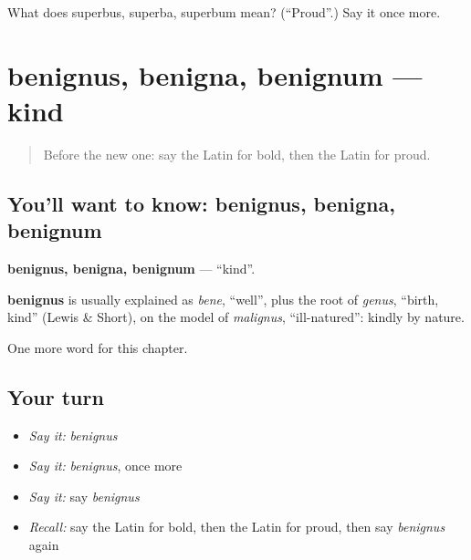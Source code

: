 \begin{tcolorbox}[breakable,colback=teal!4,colframe=teal!35!black,title={Before you move on}]
What does superbus, superba, superbum mean? (\textquotedblleft{}Proud\textquotedblright{}.) Say it once more.
\end{tcolorbox}
\section[benignus, benigna, benignum]{benignus, benigna, benignum — kind}

\label{lesson:LA-C151-benignus}



\begin{quote}
Before the new one: say the Latin for bold, then the Latin for proud.
\end{quote}

\subsection*{You'll want to know: benignus, benigna, benignum}
\textbf{benignus, benigna, benignum} — \textquotedblleft{}kind\textquotedblright{}.

\begin{cousinweb}
\textbf{benignus} is usually explained as \emph{bene}, \textquotedblleft{}well\textquotedblright{}, plus the root of \emph{genus}, \textquotedblleft{}birth, kind\textquotedblright{} (Lewis \& Short), on the model of \emph{malignus}, \textquotedblleft{}ill-natured\textquotedblright{}: kindly by nature.
\end{cousinweb}

\begin{grammarlens}[title={What you've built}]
One more word for this chapter.
\end{grammarlens}

\subsection*{Your turn}
\begin{itemize}
\raggedright
  \item \emph{Say it:} \emph{benignus}
  \item \emph{Say it:} \emph{benignus}, once more
  \item \emph{Say it:} say \emph{benignus}
  \item \emph{Recall:} say the Latin for bold, then the Latin for proud, then say \emph{benignus} again
\end{itemize}

